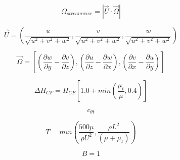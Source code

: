 \begin{equation}
\Omega_{streamwise} = | \vec U \cdot \vec \Omega |
\end{equation}

\begin{equation}
\vec U = \left(
\frac{u}{\sqrt{u^2+v^2+w^2}}, \frac{v}{\sqrt{u^2+v^2+w^2}}, \frac{w}{\sqrt{u^2+v^2+w^2}} \right)
\end{equation}

\begin{equation}
\vec \Omega = \left[
\left(\frac{\partial w}{\partial y}-\frac{\partial v}{\partial z} \right), 
\left(\frac{\partial u}{\partial z}-\frac{\partial w}{\partial x} \right), 
\left(\frac{\partial v}{\partial x}-\frac{\partial u}{\partial y} \right) \right]
\end{equation}

\begin{equation}
\Delta H_{CF} = H_{CF} \left[1.0 + min \left(\frac{\mu_t}{\mu}, 0.4 \right) \right]
\end{equation}

\begin{equation}
c_{\theta t}
\end{equation}

\begin{equation}
T = min \left( \frac{500 \mu}{\rho U^2} ,
\frac{\rho L^2}{(\mu + \mu_t)} \right)
\end{equation}

\begin{equation}
B=1
\end{equation}


